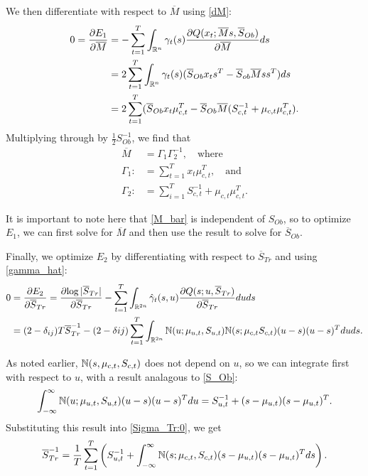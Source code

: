 \documentclass[12pt,leqno]{article}
\begin{document}
We then differentiate with respect to $\overline{M}$ using \eqref{dM}:
\begin{align*}
  0 = \frac{\partial{E_1}}{\partial{\overline{M}}} &=
  - \sum_{t=1}^T\int_{{\mathbb R}^n}\gamma_t(s)\frac{\partial{Q(x_t;\overline{M}s,\overline{S}_{Ob})}}{\partial{\overline{M}}}ds \\
  &= 2\sum_{t=1}^T\int_{{\mathbb R}^n}\gamma_t(s)(\overline{S}_{Ob}x_ts^T - \overline{S}_{ob}\overline{M}ss^T)ds \\
  &= 2\sum_{t=1}^T(\overline{S}_{Ob}x_t\mu_{c,t}^T - \overline{S}_{Ob}\overline{M}(S_{c,t}^{-1} + \mu_{c,t}\mu_{c,t}^T).
\end{align*}
Multiplying through by $\frac{1}{2}S_{Ob}^{-1}$, we find that
\begin{equation}\label{M_bar}
  \begin{split}
    \overline{M} &= \Gamma_1\Gamma_2^{-1}, \quad\text{where}\\
    \Gamma_1 :&= \sum_{t=1}^Tx_t\mu_{c,t}^T, \quad\text{and}\\
    \Gamma_2 :&= \sum_{i=1}^TS_{c,t}^{-1} + \mu_{c,t}\mu_{c,t}^T.
  \end{split}
\end{equation}

It is important to note here that \eqref{M_bar} is independent of $S_{Ob}$, so to optimize $E_1$, we can first
solve for $\overline{M}$ and then use the result to solve for $\overline{S}_{Ob}$.  

Finally, we optimize $E_2$ by differentiating with respect to $\overline{S}_{Tr}$ and using \eqref{gamma_hat}:
\begin{equation}\label{Sigma_Tr:0}
  \begin{split}
  0 &= \frac{\partial{E_2}}{\partial{\overline{S}_{Tr}}} = \frac{\partial{\log|\overline{S}_{Tr}|}}{\partial\overline{S}_{Tr}}
  - \sum_{t=1}^T\int_{{\mathbb R}^{2n}}\hat{\gamma}_t(s,u)\frac{\partial{Q(s;u,\overline{S}_{Tr})}}{\partial\overline{S}_{Tr}}duds \\
      &= (2-\delta_{ij})T\overline{S}_{Tr}^{-1} - (2-\delta{ij}) \sum_{t=1}^T\int_{{\mathbb R}^{2n}}{\mathbb N}(u;\mu_{u,t},S_{u,t}){\mathbb N}(s;\mu_{c,t}S_{c,t})(u-s)(u-s)^Tduds.
  \end{split}
\end{equation}

As noted earlier, ${\mathbb N}(s,\mu_{c,t},S_{c,t})$ does not depend on $u$, so we can integrate first with respect to $u$, with a result
analagous to \eqref{S_Ob}:
$$
  \int_{-\infty}^{\infty}{\mathbb N}(u;\mu_{u,t},S_{u,t})(u-s)(u-s)^Tdu = S_{u,t}^{-1} + (s-\mu_{u,t})(s-\mu_{u,t})^T.
$$
Substituting this result into \eqref{Sigma_Tr:0}, we get
\begin{equation}\label{Sigma_Tr:1}
  \overline{S}_{Tr}^{-1} =  \frac{1}{T}\sum_{t=1}^T\left(S_{u,t}^{-1} +\int_{-\infty}^{\infty}{\mathbb N}(s;\mu_{c,t},S_{c,t})
  (s-\mu_{u,t})(s-\mu_{u,t})^Tds\right).
\end{equation}
\end{document}
